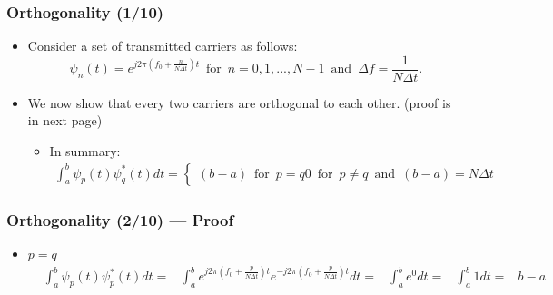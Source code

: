 \documentclass[xcolor=dvipsnames]{beamer} %
\def\\{}%
\begin{document}
\begin{frame}
    \frametitle{Orthogonality (1/10)}
    \begin{itemize}
        \item Consider a set of transmitted carriers as follows:
        \begin{equation}
            \psi_{n}(t)=e^{j2\pi(f_{0}+\frac{n}{N\Delta t})t}
            \, \text{ for }\, n=0,1,...,N-1\,\text{ and }\,\Delta f=\frac{1}{N\Delta t}.
        \end{equation}
    \end{itemize}
    \begin{itemize}
        \item  We now show that every two carriers are orthogonal to each other. (proof is in next page)
        \begin{itemize}
            \item In summary:
             \begin{align}
                 \int_{a}^{b} \psi_{p}(t) \psi_{q}^\ast(t)dt=
                 \left \{
                 \begin{array}
                 {lr}(b-a)\,\text{ for }\, p=q\\
                 0\,\text{ for }\,p\neq q \,\text{ and }\,(b-a)=N\Delta t
                 \end{array}
                 \right.
            \end{align}
        \end{itemize}
    \end{itemize}
\end{frame}
\begin{frame}
    \frametitle{Orthogonality (2/10) --- Proof}
    \begin{itemize}
        \item $p=q$
        \begin{align*}
            &\int_{a}^{b} \psi_{p}(t) \psi_{p}^\ast(t)dt\\
            =&\int_{a}^{b} e^{j2\pi(f_{0}+\frac{p}{N\Delta t})t}e^{-j2\pi(f_{0}+\frac{p}{N\Delta t})t}dt\\
            =&\int_{a}^{b}e^{0}dt\\
            =&\int_{a}^{b}1dt\\
            =&b-a
        \end{align*}
    \end{itemize}
\end{frame}
\end{document}

